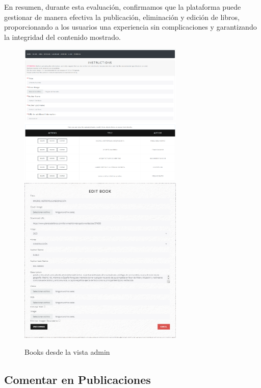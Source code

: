 \documentclass[a4paper, 12pt]{book}
\begin{document}
En resumen, durante esta evaluación, confirmamos que la plataforma puede gestionar de manera efectiva la publicación, eliminación y edición de libros, 
proporcionando a los usuarios una experiencia sin complicaciones y garantizando la integridad del contenido mostrado.
\begin{figure}
  \centering
  \includegraphics[width=0.7\textwidth]{img/booksadmin.png}
  \includegraphics[width=0.7\textwidth]{img/booksadmin2.png}
  \includegraphics[width=0.7\textwidth]{img/booksadmin3.png}
  \caption{Books desde la vista admin}
  \label{fig:librosadminedit}
\end{figure}

\subsection{Comentar en Publicaciones}
\label{sec:comment-on-posts}
\end{document}
